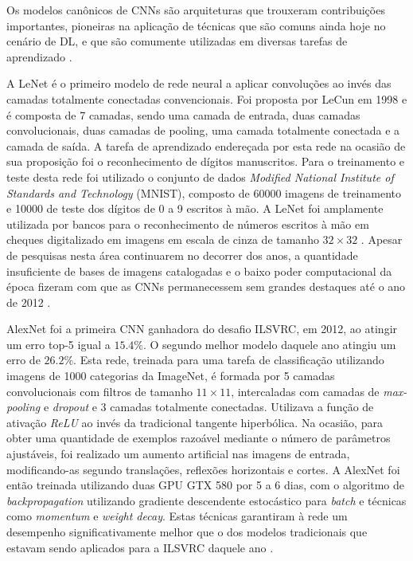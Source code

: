 Os modelos canônicos de CNNs são arquiteturas que trouxeram contribuições importantes, pioneiras na aplicação de técnicas que são comuns ainda hoje no cenário de DL, e que são comumente utilizadas em diversas tarefas de aprendizado \cite{9dlpapers}.

A LeNet é o primeiro modelo de rede neural a aplicar convoluções ao invés das camadas totalmente conectadas convencionais. Foi proposta por LeCun em 1998 e é composta de 7 camadas, sendo uma camada de entrada, duas camadas convolucionais, duas camadas de pooling, uma camada totalmente conectada e a camada de saída. A tarefa de aprendizado endereçada por esta rede na ocasião de sua proposição foi o reconhecimento de dígitos manuscritos. Para o treinamento e teste desta rede foi utilizado o conjunto de dados \emph{Modified National Institute of Standards and Technology} (MNIST), composto de 60000 imagens de treinamento e 10000 de teste dos dígitos de 0 a 9 escritos à mão. A LeNet foi amplamente utilizada por bancos para o reconhecimento de números escritos à mão em cheques digitalizado em imagens em escala de cinza de tamanho $32 \times 32$ \cite{lenet}. Apesar de pesquisas nesta área continuarem no decorrer dos anos, a quantidade insuficiente de bases de imagens catalogadas e o baixo poder computacional da época fizeram com que as CNNs permanecessem sem grandes destaques até o ano de 2012 \cite{dl9papers}.

AlexNet foi a primeira CNN ganhadora do desafio ILSVRC, em 2012, ao atingir um erro top-5 igual a $15.4\%$. O segundo melhor modelo daquele ano atingiu um erro de $26.2\%$. Esta rede, treinada para uma tarefa de classificação utilizando imagens de 1000 categorias da ImageNet, é formada por 5 camadas convolucionais com filtros de tamanho $11 \times 11$, intercaladas com camadas de \emph{max-pooling} e \emph{dropout} e $3$ camadas totalmente conectadas. Utilizava a função de ativação \emph{ReLU} ao invés da tradicional tangente hiperbólica. Na ocasião, para obter uma quantidade de exemplos razoável mediante o número de parâmetros ajustáveis, foi realizado um aumento artificial nas imagens de entrada, modificando-as segundo translações, reflexões horizontais e cortes. A AlexNet foi então treinada utilizando duas GPU GTX 580 por 5 a 6 dias, com o algoritmo de \emph{backpropagation} utilizando gradiente descendente estocástico para \emph{batch} e técnicas como \emph{momentum} e \emph{weight decay}. Estas técnicas garantiram à rede um desempenho significativamente melhor que o dos modelos tradicionais que estavam sendo aplicados para a ILSVRC daquele ano \cite{alexnet}.

